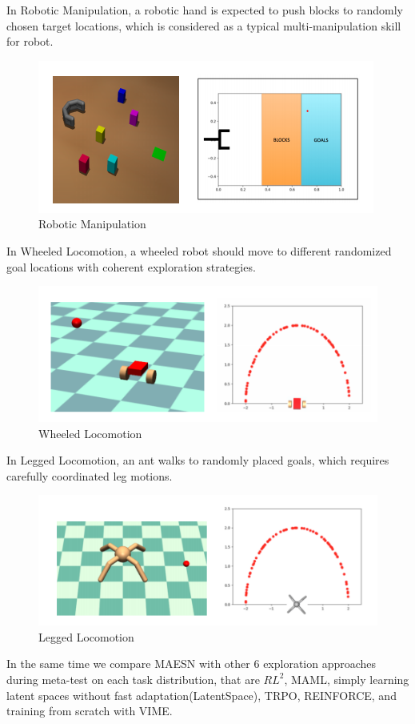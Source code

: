 In Robotic Manipulation, a robotic hand is expected to push blocks to randomly chosen target locations, which is considered as a typical multi-manipulation skill for robot.
\begin{figure}[H]
	\includegraphics[scale=0.6]{MAESN_05.PNG}
	\centering
	\caption{Robotic Manipulation}
	\label{MAESN}
\end{figure}

In Wheeled Locomotion, a wheeled robot should move to different randomized goal locations with coherent exploration strategies.
\begin{figure}[H]
	\includegraphics[scale=0.53]{MAESN_06.PNG}
	\centering
	\caption{Wheeled Locomotion}
	\label{MAESN}
\end{figure}

In Legged Locomotion, an ant walks to randomly placed goals, which requires carefully coordinated leg motions.
\begin{figure}[H]
	\includegraphics[scale=0.53]{MAESN_07.PNG}
	\centering
	\caption{Legged Locomotion}
	\label{MAESN}
\end{figure}
In the same time we compare MAESN with other 6 exploration approaches during meta-test on each task distribution, that are $RL^{2}$, MAML, simply learning latent spaces without fast adaptation(LatentSpace), TRPO, REINFORCE, and training from scratch with VIME. 

